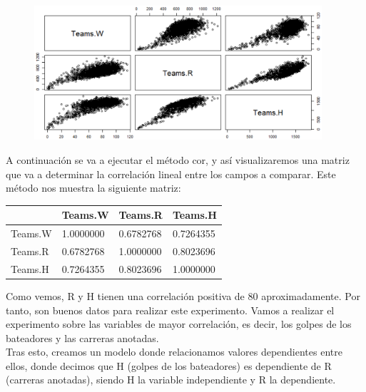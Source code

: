 \documentclass[10pt]{article}
\begin{document}
\begin{figure}[H]
	\begin{center}
 		\includegraphics[width = 0.95\textwidth]{Imagenes/regresion.eps}
	\end{center} 
\end{figure}

A continuación se va a ejecutar el método cor, y así visualizaremos una matriz que va a determinar la correlación lineal entre los campos a comparar. Este método nos muestra la siguiente matriz:\\

\begin{table}[htb]
\centering
\begin{tabular}{|l|l|l|l|}
\hline
\cline{2-4}
& Teams.W & Teams.R & Teams.H\\
\hline \hline
{Teams.W} & 1.0000000 & 0.6782768 & 0.7264355\\ \cline{1-4}
{Teams.R} & 0.6782768 & 1.0000000 & 0.8023696\\ \cline{1-4}
{Teams.H} & 0.7264355 & 0.8023696 & 1.0000000\\ \cline{1-4}
\end{tabular}
\label{tabla:final}
\end{table}

Como vemos, R y H tienen una correlación positiva de 80%
aproximadamente. Por tanto, son buenos datos para realizar este experimento. Vamos a realizar el experimento sobre las variables de mayor correlación, es decir, los golpes de los
bateadores y las carreras anotadas.\\

Tras esto, creamos un modelo donde relacionamos valores dependientes entre ellos, donde decimos que H (golpes de los bateadores) es dependiente de R (carreras anotadas), siendo H la variable independiente y R la dependiente.\\
\end{document}
